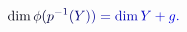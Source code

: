 \documentclass[12pt]{article}
\begin{document}
\makeatletter
\renewcommand*{\@textcolor}[3]{%
  \protect\leavevmode
  \begingroup
    \color#1{#2}#3%
  \endgroup
}
\makeatother
\begin{displaymath}
\mathcolor[RGB]{0,0,15}{\dim} \mathcolor[RGB]{0,0,30}{\phi} \mathcolor[RGB]{0,0,45}{(} \mathcolor[RGB]{0,0,60}{p} ^ { \mathcolor[RGB]{0,0,75}{-} \mathcolor[RGB]{0,0,90}{1} } \mathcolor[RGB]{0,0,105}{(} \mathcolor[RGB]{0,0,120}{Y} \mathcolor[RGB]{0,0,135}{)} \mathcolor[RGB]{0,0,150}{)} \mathcolor[RGB]{0,0,165}{=} \mathcolor[RGB]{0,0,180}{\dim} \mathcolor[RGB]{0,0,195}{Y} \mathcolor[RGB]{0,0,210}{+} \mathcolor[RGB]{0,0,225}{g} \mathcolor[RGB]{0,0,240}{.}
\end{displaymath}
\end{document}
